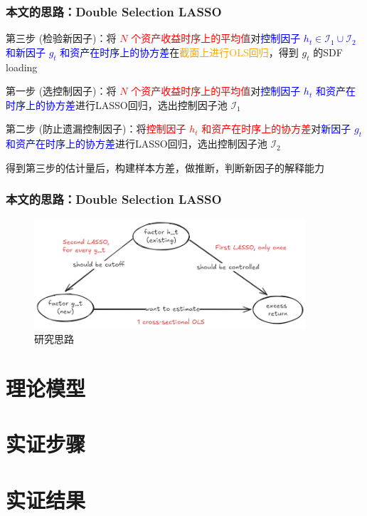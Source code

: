 \documentclass[
  UTF8,
  xcolor={dvipsnames,rgb},
  hyperref={colorlinks, citecolor=orange, linkcolor=black},
  ]{beamer}
\begin{document}
\begin{frame}
    \frametitle{本文的思路：Double Selection LASSO}


    \begin{wideitemize}
        \item 第三步 (检验新因子)：将 \textcolor{red}{\(N\) 个资产收益时序上的平均值}对\textcolor{blue}{控制因子 \(h_{t} \in \mathcal{I}_1 \cup \mathcal{I}_2\) 和新因子 \(g_{t}\) 和资产在时序上的协方差}在\textcolor{orange}{截面上进行OLS回归}，得到 \(g_{t}\) 的SDF loading
        \item 第一步 (选控制因子)：将 \textcolor{red}{\(N\) 个资产收益时序上的平均值}对\textcolor{blue}{控制因子 \(h_{t}\) 和资产在时序上的协方差}进行LASSO回归，选出控制因子池 \(\mathcal{I}_1\)
        \item 第二步 (防止遗漏控制因子)：将\textcolor{red}{控制因子 \(h_{t}\) 和资产在时序上的协方差}对\textcolor{blue}{新因子 \(g_{t}\) 和资产在时序上的协方差}进行LASSO回归，选出控制因子池 \(\mathcal{I}_2\)
        \item 得到第三步的估计量后，构建样本方差，做推断，判断新因子的解释能力
    \end{wideitemize}

\end{frame}

\begin{frame}
    \frametitle{本文的思路：Double Selection LASSO}

    \begin{figure}[H]
    \begin{center}
    \includegraphics[width=0.9\textwidth]{../assets/idea.png}
    \end{center}
    \caption{研究思路}
    \label{pic:1}
    \end{figure}

\end{frame}

\section{理论模型}

\section{实证步骤}

\section{实证结果}
\end{document}
